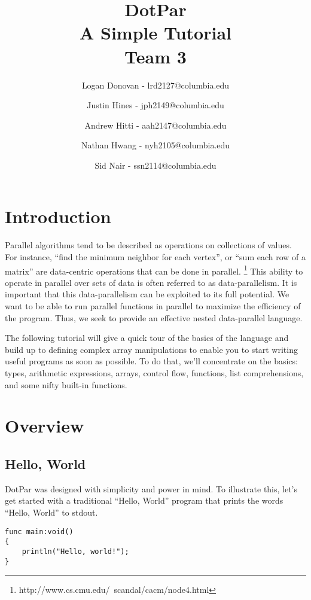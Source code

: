 \documentclass{article}
\begin{document}
\title{DotPar \\ A Simple Tutorial \\ Team 3}
\author{
Logan Donovan - lrd2127@columbia.edu \and
Justin Hines - jph2149@columbia.edu \and
Andrew Hitti - aah2147@columbia.edu \and
Nathan Hwang - nyh2105@columbia.edu \and
Sid Nair - ssn2114@columbia.edu}
\maketitle

\section{Introduction}
Parallel algorithms tend to be described as operations on collections of values. For instance, ``find the minimum neighbor for each vertex'', or ``sum each row of a matrix'' are data-centric operations that can be done in parallel. \footnote{http://www.cs.cmu.edu/~scandal/cacm/node4.html} This ability to operate in parallel over sets of data is often referred to as data-parallelism. It is important that this data-parallelism can be exploited to its full potential. We want to be able to run parallel functions in parallel to maximize the efficiency of the program. Thus, we seek to provide an effective nested data-parallel language.

The following tutorial will give a quick tour of the basics of the language and build up to defining complex array manipulations to enable you to start writing useful programs as soon as possible. To do that, we'll concentrate on the basics: types, arithmetic expressions, arrays, control flow, functions, list comprehensions, and some nifty built-in functions.

\section{Overview}
\subsection{Hello, World}
DotPar was designed with simplicity and power in mind. To illustrate this, let's get started with a traditional ``Hello, World'' program that prints the words ``Hello, World'' to stdout.

\begin{verbatim}
func main:void()
{
    println("Hello, world!");
}
\end{verbatim}
\end{document}
